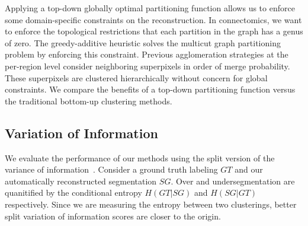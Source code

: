 Applying a top-down globally optimal partitioning function allows us to enforce some domain-specific constraints on the reconstruction.
In connectomics, we want to enforce the topological restrictions that each partition in the graph has a genus of zero. 
The greedy-additive heuristic solves the multicut graph partitioning problem by enforcing this constraint.
Previous agglomeration strategies at the per-region level consider neighboring superpixels in order of merge probability. 
These superpixels are clustered hierarchically without concern for global constraints.
We compare the benefits of a top-down partitioning function versus the traditional bottom-up clustering methods.

\subsection{Variation of Information}

We evaluate the performance of our methods using the split version of the variance of information~\cite{meila2003comparing}. 
Consider a ground truth labeling $GT$ and our automatically reconstructed segmentation $SG$. 
Over and undersegmentation are quanitified by the conditional entropy $H(GT | SG)$ and $H(SG | GT)$ respectively. 
Since we are measuring the entropy between two clusterings, better split variation of information scores are closer to the origin.